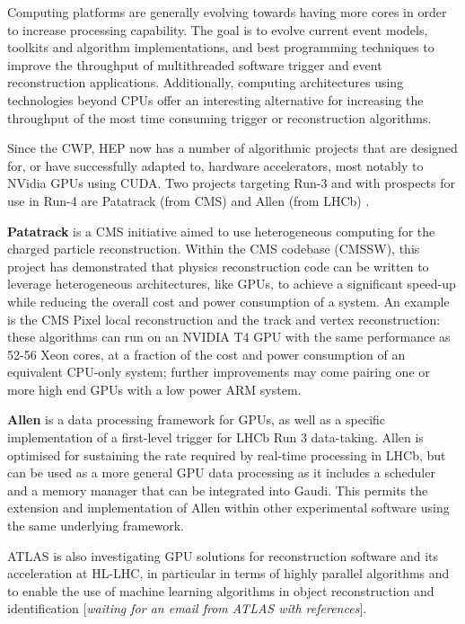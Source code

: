 Computing platforms are generally evolving towards having more cores in
order to increase processing capability. The goal is to evolve current
event models, toolkits and algorithm implementations, and best
programming techniques to improve the throughput of multithreaded
software trigger and event reconstruction applications. Additionally,
computing architectures using technologies beyond CPUs offer an
interesting alternative for increasing the throughput of the most time
consuming trigger or reconstruction algorithms.

Since the CWP, HEP now has a number of algorithmic projects that are
designed for, or have successfully adapted to, hardware accelerators,
most notably to NVidia GPUs using CUDA. Two projects targeting Run-3 and
with prospects for use in Run-4 are Patatrack (from CMS) \cite{andrea_bocci_2019_3598824} and
Allen (from LHCb) \cite{Aaij:2019zbu}.

\textbf{Patatrack} is a CMS initiative aimed to use heterogeneous
computing for the charged particle reconstruction. Within the CMS
codebase (CMSSW), this project has demonstrated that physics
reconstruction code can be written to leverage heterogeneous
architectures, like GPUs, to achieve a significant speed-up while
reducing the overall cost and power consumption of a system. An example
is the CMS Pixel local reconstruction and the track and vertex
reconstruction: these algorithms can run on an NVIDIA T4 GPU with the
same performance as 52-56 Xeon cores, at a fraction of the cost and
power consumption of an equivalent CPU-only system; further improvements
may come pairing one or more high end GPUs with a low power ARM system.

\textbf{Allen} is a data processing framework for GPUs, as well as a
specific implementation of a first-level trigger for LHCb Run 3
data-taking. Allen is optimised for sustaining the rate required by
real-time processing in LHCb, but can be used as a more general GPU data
processing as it includes a scheduler and a memory manager that can be
integrated into Gaudi. This permits the extension and implementation of
Allen within other experimental software using the same underlying
framework.

ATLAS is also investigating GPU solutions for reconstruction software
and its acceleration at HL-LHC, in particular in terms of highly
parallel algorithms \cite{attila_krasznahorkay_2019_3599103} and to enable the use of machine learning
algorithms in object reconstruction and identification {[}\emph{waiting
for an email from ATLAS with references}{]}.

